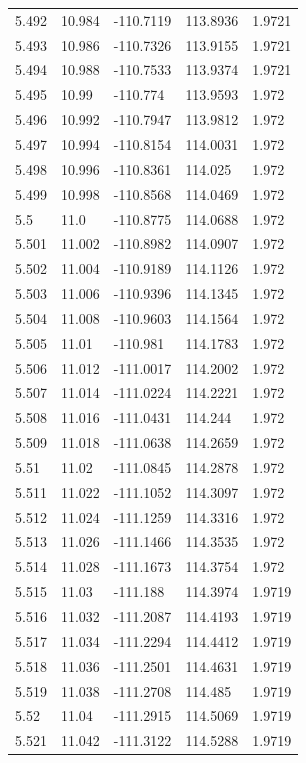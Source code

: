 \begin{tabular}{lllll}
5.492 & 10.984 & -110.7119 & 113.8936 & 1.9721 \\
5.493 & 10.986 & -110.7326 & 113.9155 & 1.9721 \\
5.494 & 10.988 & -110.7533 & 113.9374 & 1.9721 \\
5.495 & 10.99 & -110.774 & 113.9593 & 1.972 \\
5.496 & 10.992 & -110.7947 & 113.9812 & 1.972 \\
5.497 & 10.994 & -110.8154 & 114.0031 & 1.972 \\
5.498 & 10.996 & -110.8361 & 114.025 & 1.972 \\
5.499 & 10.998 & -110.8568 & 114.0469 & 1.972 \\
5.5 & 11.0 & -110.8775 & 114.0688 & 1.972 \\
5.501 & 11.002 & -110.8982 & 114.0907 & 1.972 \\
5.502 & 11.004 & -110.9189 & 114.1126 & 1.972 \\
5.503 & 11.006 & -110.9396 & 114.1345 & 1.972 \\
5.504 & 11.008 & -110.9603 & 114.1564 & 1.972 \\
5.505 & 11.01 & -110.981 & 114.1783 & 1.972 \\
5.506 & 11.012 & -111.0017 & 114.2002 & 1.972 \\
5.507 & 11.014 & -111.0224 & 114.2221 & 1.972 \\
5.508 & 11.016 & -111.0431 & 114.244 & 1.972 \\
5.509 & 11.018 & -111.0638 & 114.2659 & 1.972 \\
5.51 & 11.02 & -111.0845 & 114.2878 & 1.972 \\
5.511 & 11.022 & -111.1052 & 114.3097 & 1.972 \\
5.512 & 11.024 & -111.1259 & 114.3316 & 1.972 \\
5.513 & 11.026 & -111.1466 & 114.3535 & 1.972 \\
5.514 & 11.028 & -111.1673 & 114.3754 & 1.972 \\
5.515 & 11.03 & -111.188 & 114.3974 & 1.9719 \\
5.516 & 11.032 & -111.2087 & 114.4193 & 1.9719 \\
5.517 & 11.034 & -111.2294 & 114.4412 & 1.9719 \\
5.518 & 11.036 & -111.2501 & 114.4631 & 1.9719 \\
5.519 & 11.038 & -111.2708 & 114.485 & 1.9719 \\
5.52 & 11.04 & -111.2915 & 114.5069 & 1.9719 \\
5.521 & 11.042 & -111.3122 & 114.5288 & 1.9719 \\

\end{tabular}
